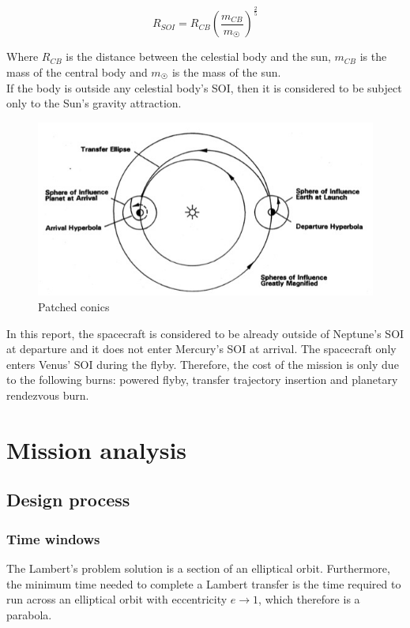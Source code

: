 \documentclass[11pt,a4paper]{report}
\begin{document}
\begin{equation*}
    R_{SOI} = R_{CB}\left(\frac{m_{CB}}{m_{\astrosun}}\right)^{\frac{2}{5}}
\end{equation*}

Where $R_{CB}$ is the distance between the celestial body and the sun, $m_{CB}$ is the mass of the central body and $m_{\astrosun}$ is the mass of the sun.\\ 
If the body is outside any celestial body’s SOI, then it is considered to be subject only to the Sun’s gravity attraction.\\

\begin{figure}[H]
\includegraphics[width = \textwidth]{patched_conics.jpg}
\caption{Patched conics}
\end{figure}

In this report, the spacecraft is considered to be already outside of Neptune’s SOI at departure and it does not enter Mercury’s SOI at arrival. The spacecraft only enters Venus’ SOI during the flyby. Therefore, the cost of the mission is only due to the following burns: powered flyby, transfer trajectory insertion and planetary rendezvous burn.

\section{Mission analysis}

\subsection{Design process}
\subsubsection{Time windows}
The Lambert’s problem solution is a section of an elliptical orbit. Furthermore, the minimum time needed to complete a Lambert transfer is the time required to run across an elliptical orbit with eccentricity $e\rightarrow1$, which therefore is a parabola.
\end{document}
